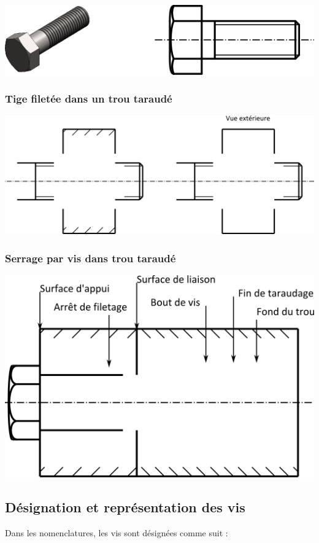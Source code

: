 \documentclass[11pt,oneside]{article}
\begin{document}
\begin{center}
\includegraphics[width=.5\textwidth]{png/vis_rep}
\end{center}

\subsubsection{Tige filetée dans un trou taraudé}
\begin{center}
\includegraphics[width=.8\textwidth]{png/tige_trou}
\end{center}

\subsubsection{Serrage par vis dans trou taraudé}
\begin{center}
\includegraphics[width=.5\textwidth]{png/serrage_vis}
\end{center}

\subsection{Désignation et représentation des vis}


Dans les nomenclatures, les vis sont désignées comme suit : 
\end{document}
